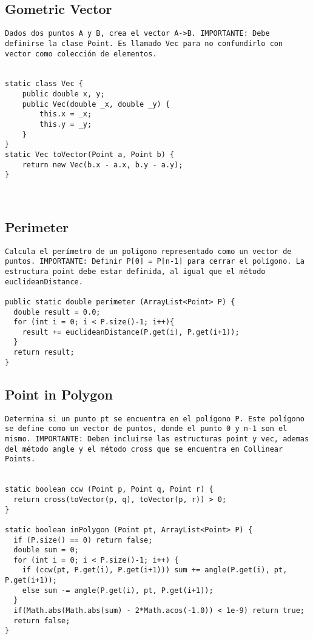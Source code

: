 \documentclass[10pt,letterpaper,twocolumn,twosided]{article}
\begin{document}
\subsection{Gometric Vector}
\begin{lstlisting}
Dados dos puntos A y B, crea el vector A->B. IMPORTANTE: Debe definirse la clase Point. Es llamado Vec para no confundirlo con vector como colección de elementos.


static class Vec { 
    public double x, y;
    public Vec(double _x, double _y) {
        this.x = _x;
        this.y = _y;
    }
}
static Vec toVector(Point a, Point b) {       
	return new Vec(b.x - a.x, b.y - a.y); 
}



\end{lstlisting}

\subsection{Perimeter}
\begin{lstlisting}
Calcula el perímetro de un polígono representado como un vector de puntos. IMPORTANTE: Definir P[0] = P[n-1] para cerrar el polígono. La estructura point debe estar definida, al igual que el método euclideanDistance.

public static double perimeter (ArrayList<Point> P) {
  double result = 0.0;
  for (int i = 0; i < P.size()-1; i++){
    result += euclideanDistance(P.get(i), P.get(i+1));
  }
  return result; 
}
\end{lstlisting}

\subsection{Point in Polygon}
\begin{lstlisting}
Determina si un punto pt se encuentra en el polígono P. Este polígono se define como un vector de puntos, donde el punto 0 y n-1 son el mismo. IMPORTANTE: Deben incluirse las estructuras point y vec, ademas del método angle y el método cross que se encuentra en Collinear Points.


static boolean ccw (Point p, Point q, Point r) {
  return cross(toVector(p, q), toVector(p, r)) > 0; 
}
  
static boolean inPolygon (Point pt, ArrayList<Point> P) {
  if (P.size() == 0) return false;
  double sum = 0;    
  for (int i = 0; i < P.size()-1; i++) {
    if (ccw(pt, P.get(i), P.get(i+1))) sum += angle(P.get(i), pt, P.get(i+1)); 
    else sum -= angle(P.get(i), pt, P.get(i+1));
  }
  if(Math.abs(Math.abs(sum) - 2*Math.acos(-1.0)) < 1e-9) return true;
  return false;
}
\end{lstlisting}
\end{document}
